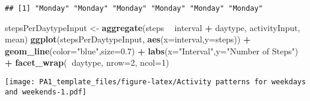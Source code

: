 \documentclass[
]{article}
\newenvironment{Shaded}{\begin{snugshade}}{\end{snugshade}}
\newcommand{\DataTypeTok}[1]{\textcolor[rgb]{0.13,0.29,0.53}{#1}}
\newcommand{\DecValTok}[1]{\textcolor[rgb]{0.00,0.00,0.81}{#1}}
\newcommand{\FloatTok}[1]{\textcolor[rgb]{0.00,0.00,0.81}{#1}}
\newcommand{\KeywordTok}[1]{\textcolor[rgb]{0.13,0.29,0.53}{\textbf{#1}}}
\newcommand{\NormalTok}[1]{#1}
\newcommand{\OperatorTok}[1]{\textcolor[rgb]{0.81,0.36,0.00}{\textbf{#1}}}
\newcommand{\StringTok}[1]{\textcolor[rgb]{0.31,0.60,0.02}{#1}}
\begin{document}
\begin{verbatim}
## [1] "Monday" "Monday" "Monday" "Monday" "Monday" "Monday"
\end{verbatim}

\begin{Shaded}
\begin{Highlighting}[]
\NormalTok{stepsPerDaytypeInput <-}\StringTok{ }\KeywordTok{aggregate}\NormalTok{(steps }\OperatorTok{~}\StringTok{ }\NormalTok{interval }\OperatorTok{+}\StringTok{ }\NormalTok{daytype, activityInput, mean)}
\KeywordTok{ggplot}\NormalTok{(stepsPerDaytypeInput, }\KeywordTok{aes}\NormalTok{(}\DataTypeTok{x=}\NormalTok{interval,}\DataTypeTok{y=}\NormalTok{steps)) }\OperatorTok{+}\StringTok{ }
\KeywordTok{geom_line}\NormalTok{(}\DataTypeTok{color=}\StringTok{"blue"}\NormalTok{,}\DataTypeTok{size=}\FloatTok{0.7}\NormalTok{) }\OperatorTok{+}\StringTok{ }
\KeywordTok{labs}\NormalTok{(}\DataTypeTok{x=}\StringTok{"Interval"}\NormalTok{,}\DataTypeTok{y=}\StringTok{"Number of Steps"}\NormalTok{) }\OperatorTok{+}\StringTok{ }
\KeywordTok{facet_wrap}\NormalTok{(}\OperatorTok{~}\NormalTok{daytype, }\DataTypeTok{nrow=}\DecValTok{2}\NormalTok{, }\DataTypeTok{ncol=}\DecValTok{1}\NormalTok{)}
\end{Highlighting}
\end{Shaded}

\texttt{[image: PA1\_template\_files/figure-latex/Activity patterns for weekdays and weekends-1.pdf]}
\end{document}
